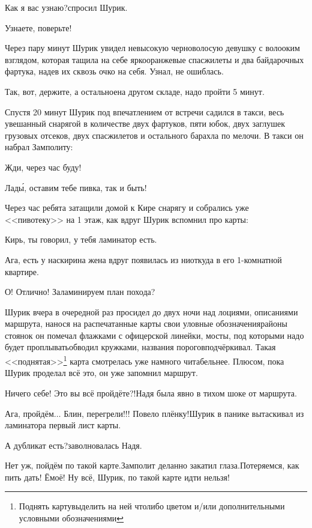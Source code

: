 \diagdash Как я вас узнаю?\mdash спросил Шурик.

\diagdash Узнаете, поверьте!

Через пару минут Шурик увидел невысокую черноволосую девушку с волооким взглядом, которая тащила на себе ярко\sdash оранжевые спасжилеты и два байдарочных фартука, надев их сквозь очко на себя. Узнал, не ошиблась.

\diagdash Так, вот, держите, а остальное\mdash на другом складе, надо пройти 5 минут.

Спустя 20 минут Шурик под впечатлением от встречи садился в такси, весь увешанный снарягой в количестве двух фартуков, пяти юбок, двух заглушек грузовых отсеков, двух спасжилетов и остального барахла по мелочи. В такси он набрал Замполиту:

\diagdash Жди, через час буду!

\diagdash Лад\'{ы}, оставим тебе пивка, так и быть!

Через час ребята затащили домой к Кире снарягу и собрались уже <<пивотеку>> на 1 этаж, как вдруг Шурик вспомнил про карты:

\diagdash Кирь, ты говорил, у тебя ламинатор есть.

\diagdash Ага, есть у нас\mdash кирина жена вдруг появилась из ниоткуда в его 1-комнатной квартире.

\diagdash О! Отлично! Заламинируем план похода?

Шурик вчера в очередной раз просидел до двух ночи над лоциями, описаниями маршрута, нанося на распечатанные карты свои уловные обозначения\mdash районы стоянок он помечал флажками с офицерской линейки, мосты, под которыми надо будет проплывать\mdash обводил кружками, названия порогов\mdash подчёркивал. Такая <<поднятая>>\footnote{Поднять карту\mdash выделить на ней что\sdash либо цветом и/или дополнительными условными обозначениями} карта смотрелась уже намного читабельнее. Плюсом, пока Шурик проделал всё это, он уже запомнил маршрут.

\diagdash Ничего себе! Это вы всё пройдёте?!\mdash Надя была явно в тихом шоке от маршрута.

\diagdash Ага, пройдём$\ldots$ Блин, перегрели!!! Повело плёнку!\mdash Шурик в панике вытаскивал из ламинатора первый лист карты.

\diagdash А дубликат есть?\mdash заволновалась Надя.

\diagdash Нет уж, пойдём по такой карте.\mdash Замполит деланно закатил глаза.\mdash Потеряемся, как пить дать! Ё\sdash моё! Ну всё, Шурик, по такой карте идти нельзя! 

